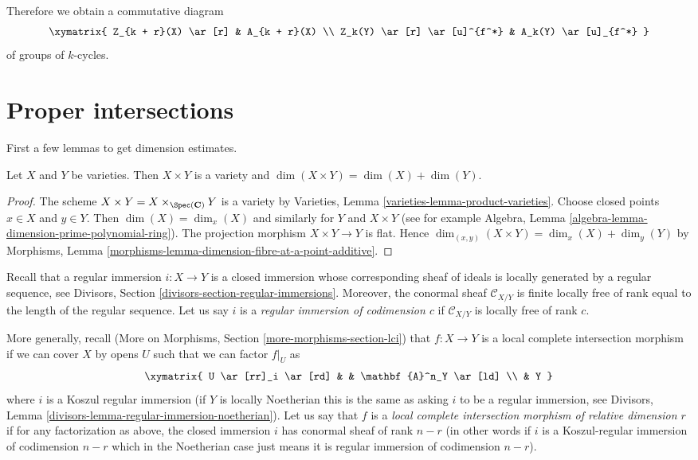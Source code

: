 \medskip\noindent
Therefore we obtain a commutative diagram
$$
\xymatrix{
Z_{k + r}(X) \ar[r] & A_{k + r}(X) \\
Z_k(Y) \ar[r] \ar[u]^{f^*} & A_k(Y) \ar[u]_{f^*}
}
$$
of groups of $k$-cycles.


\section{Proper intersections}
\label{section-intersect-properly}

\noindent
First a few lemmas to get dimension estimates.

\begin{lemma}
\label{lemma-dimension-product-varieties}
Let $X$ and $Y$ be varieties. Then $X \times Y$ is a variety and
$\dim(X \times Y) = \dim(X) + \dim(Y)$.
\end{lemma}

\begin{proof}
The scheme $X \times Y = X \times_{\Spec(\mathbf{C})} Y$ is a variety by
Varieties, Lemma \ref{varieties-lemma-product-varieties}.
Choose closed points $x \in X$ and $y \in Y$.
Then $\dim(X) = \dim_x(X)$ and similarly for $Y$ and $X \times Y$
(see for example
Algebra, Lemma \ref{algebra-lemma-dimension-prime-polynomial-ring}).
The projection morphism $X \times Y \to Y$ is flat. Hence
$\dim_{(x, y)}(X \times Y) = \dim_x(X) + \dim_y(Y)$ by
Morphisms, Lemma \ref{morphisms-lemma-dimension-fibre-at-a-point-additive}.
\end{proof}

\medskip\noindent
Recall that a regular immersion $i : X \to Y$ is a closed immersion whose
corresponding sheaf of ideals is locally generated by a regular sequence, see
Divisors, Section \ref{divisors-section-regular-immersions}.
Moreover, the conormal sheaf $\mathcal{C}_{X/Y}$ is finite locally free of
rank equal to the length of the regular sequence. Let us say $i$ is a
{\it regular immersion of codimension $c$}
if $\mathcal{C}_{X/Y}$ is locally free of rank $c$.

\medskip\noindent
More generally, recall
(More on Morphisms, Section \ref{more-morphisms-section-lci})
that $f : X \to Y$ is a local complete intersection
morphism if we can cover $X$ by opens $U$ such that we can factor
$f|_U$ as
$$
\xymatrix{
U \ar[rr]_i \ar[rd] & & \mathbf{A}^n_Y \ar[ld] \\
& Y
}
$$
where $i$ is a Koszul regular immersion (if $Y$ is locally Noetherian
this is the same as asking $i$ to be a regular immersion, see
Divisors, Lemma \ref{divisors-lemma-regular-immersion-noetherian}).
Let us say that $f$ is a {\it local complete intersection morphism
of relative dimension $r$} if for any factorization as above, the
closed immersion $i$ has conormal sheaf of rank $n - r$ (in other
words if $i$ is a Koszul-regular immersion of codimension $n - r$
which in the Noetherian case just means it is regular immersion of
codimension $n - r$).

